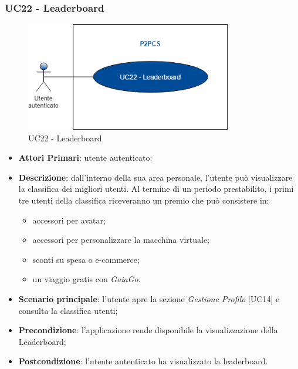 \subsubsection{UC22 - Leaderboard}
\begin{figure}[h]
	\includegraphics[width=9cm]{res/images/UC22Leaderboard.png}
	\centering
	\caption{UC22 - Leaderboard}
\end{figure}
\begin{itemize}
	\item \textbf{Attori Primari}: utente autenticato;
	\item \textbf{Descrizione}: dall'interno della sua area personale, l'utente può visualizzare la classifica dei migliori utenti. Al termine di un periodo prestabilito, i primi tre utenti della classifica riceveranno un premio che può consistere in:
	\begin{itemize}
		\item accessori per avatar;
		\item accessori per personalizzare la macchina virtuale;
		\item sconti su spesa o e-commerce;
		\item un viaggio gratis con \textit{GaiaGo}.
	\end{itemize}
	\item \textbf{Scenario principale}: l'utente apre la sezione \textit{Gestione Profilo} [UC14] e consulta la classifica utenti;
	\item \textbf{Precondizione}: l'applicazione rende disponibile la visualizzazione della Leaderboard\glo;
	\item \textbf{Postcondizione}: l'utente autenticato ha visualizzato la leaderboard.
\end{itemize}

